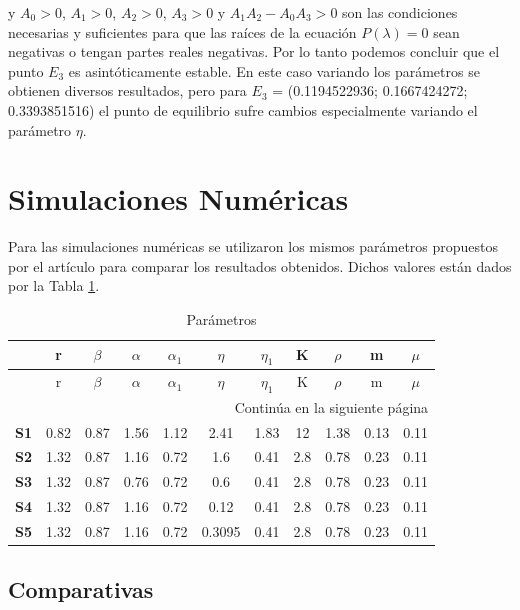 \documentclass{wscpaperproc}
\theoremstyle{wsc}
\begin{document}
y $A_0 > 0$, $A_1 > 0$, $A_2 > 0$, $A_3 > 0$ y $A_1 A_2 - A_0 A_3 > 0$ son las condiciones necesarias y suficientes
para que las raíces de la ecuación $P(\lambda) = 0$ sean negativas o tengan partes reales negativas. Por lo tanto podemos 
concluir que el punto $E_3$ es asint\'oticamente estable. En este caso variando los par\'ametros se obtienen diversos resultados, 
pero para  $E_3$ = (0.1194522936; 0.1667424272; 0.3393851516) el punto de equilibrio sufre cambios especialmente variando el par\'ametro $\eta$.

\section{Simulaciones Numéricas}
Para las simulaciones numéricas se utilizaron los mismos parámetros propuestos por el artículo para comparar los resultados obtenidos.
Dichos valores están dados por la Tabla \ref{tab:first}.


\begin{longtable}{rcccccccccc}
	\caption{Par\'ametros\label{tab:first}}                                                                \\
	\hline
	            & r    & $\beta$ & $\alpha$ & $\alpha_1$ & $\eta$ & $\eta_1$ & K   & $\rho$ & m    & $\mu$ \\ \hline
	\endfirsthead
	\hline
	            & r    & $\beta$ & $\alpha$ & $\alpha_1$ & $\eta$ & $\eta_1$ & K   & $\rho$ & m    & $\mu$ \\ \hline
	\endhead
	\hline
	\multicolumn{11}{|r|}{{Continúa en la siguiente página}}                                               \\ \hline
	\endfoot
	\hline
	\endlastfoot
	\textbf{S1} & 0.82 & 0.87    & 1.56     & 1.12       & 2.41   & 1.83     & 12  & 1.38   & 0.13 & 0.11  \\
	\textbf{S2} & 1.32 & 0.87    & 1.16     & 0.72       & 1.6    & 0.41     & 2.8 & 0.78   & 0.23 & 0.11  \\
	\textbf{S3} & 1.32 & 0.87    & 0.76     & 0.72       & 0.6    & 0.41     & 2.8 & 0.78   & 0.23 & 0.11  \\
	\textbf{S4} & 1.32 & 0.87    & 1.16     & 0.72       & 0.12   & 0.41     & 2.8 & 0.78   & 0.23 & 0.11  \\
	\textbf{S5} & 1.32 & 0.87    & 1.16     & 0.72       & 0.3095 & 0.41     & 2.8 & 0.78   & 0.23 & 0.11  \\
\end{longtable}

\subsection{Comparativas}
\end{document}
